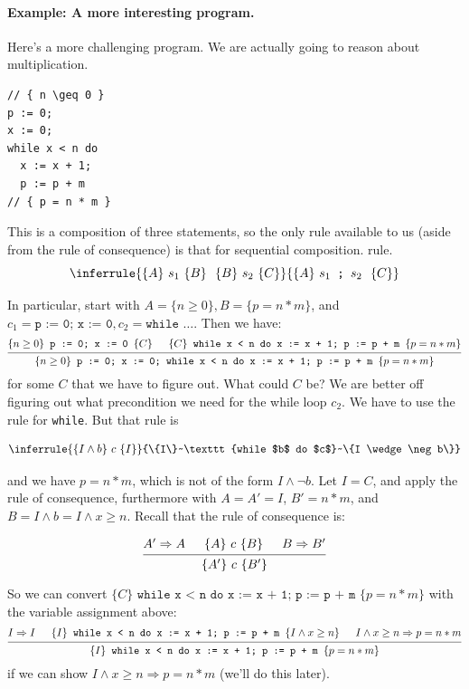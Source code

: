 \documentclass[11pt]{article}
\begin{document}
\paragraph{Example: A more interesting program.} Here's a more challenging program.
We are actually going to reason about multiplication.

\begin{lstlisting}
// { n \geq 0 }
p := 0;
x := 0;
while x < n do
  x := x + 1;
  p := p + m
// { p = n * m }
\end{lstlisting}

This is a composition of three statements, so the only rule available to us (aside from the rule of consequence) is that for sequential composition.
rule.
\[
  \inferrule{\{A\}~s_1~\{B\} ~~ \{B\}~s_2~\{C\}}{\{A\}~s_1 \texttt{~;~} s_2~~\{C\}}
\]

In particular, start with $A = \{ n \geq 0 \}, B = \{ p = n * m \}$, and $c_1 = \texttt{p := 0; x := 0}, c_2 = \texttt{while \ldots}$. Then we have:
\[
\begin{prooftree}
\hypo{\{ n \geq 0 \} \texttt{~p := 0; x := 0~} \{ C \}}
\hypo{\{ C \} \texttt{~while x < n do x := x + 1; p := p + m~} \{ p = n * m \}}
\infer2{\{ n \geq 0 \} \texttt{~p := 0; x := 0; while x < n do x := x + 1; p := p + m~} \{ p = n * m \}}
\end{prooftree}
\]
for some $C$ that we have to figure out. What could $C$ be? We are better off figuring out what precondition we need for the while loop $c_2$. We have to use the rule for \texttt{while}. But that rule is

\[
    \inferrule{\{I \wedge b\}~c~\{I\} }{\{I\}~\texttt{while $b$ do $c$}~\{I \wedge \neg b\}}
\]

and we have $p = n * m$, which is not of the form $I \wedge \neg b$. Let $I = C$, and apply the rule of consequence, furthermore with $A = A' = I$, $B' = n * m$, and $B = I \wedge b = I \wedge x \geq n$.  Recall that the rule of consequence is:

\[
\begin{prooftree}
  \hypo{A' \Rightarrow A}
  \hypo{\{A \} ~c~ \{ B\} }
  \hypo{B \Rightarrow B'}
  \infer3{\{A'\} ~c~\{B' \}}
\end{prooftree}
\]

So we can convert $\{ C \} \texttt{~while x < n do x := x + 1; p := p + m~} \{ p = n * m \}$ with the variable assignment above:
\[
\begin{prooftree}
  \hypo{I \Rightarrow I}
  \hypo{\{I \} \texttt{~while x < n do x := x + 1; p := p + m~} \{ I \wedge x \geq n \} }
  \hypo{I \wedge x \geq n \Rightarrow p = n * m }
  \infer3{\{I \} \texttt{~while x < n do x := x + 1; p := p + m~}\{ p = n * m \}}
\end{prooftree}
\]
if we can show $I \wedge x \geq n \Rightarrow p = n * m$ (we'll do this later).
\end{document}
